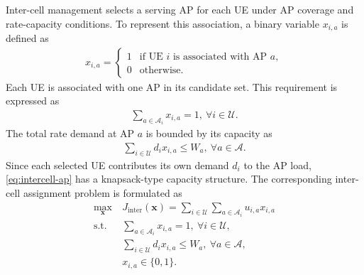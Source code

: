 \documentclass[journal]{IEEEtran}
\begin{document}
{{Inter-cell management selects a serving AP for each UE under AP coverage and rate-capacity conditions. To represent this association, a binary variable $x_{i,a}$ is defined as
\begin{align}
x_{i,a}=\begin{cases}
1 & \text{if UE $i$ is associated with AP $a$},\\
0 & \text{otherwise}.
\end{cases}
\label{eq:intercell-variable}
\end{align}
Each UE is associated with one AP in its candidate set. This requirement is expressed as
\begin{align}
\sum_{a\in\mathcal{A}_i}x_{i,a}=1,~\forall i\in\mathcal{U}.
\label{eq:intercell-ue}
\end{align}
The total rate demand at AP $a$ is bounded by its capacity as
\begin{align}
\sum_{i\in\mathcal{U}} d_i x_{i,a}\leq W_a,~\forall a\in\mathcal{A}.
\label{eq:intercell-ap}
\end{align}
Since each selected UE contributes its own demand $d_i$ to the AP load, \eqref{eq:intercell-ap} has a knapsack-type capacity structure. The corresponding inter-cell assignment problem is formulated as
\begin{align}
\max_{\bm x}~&J_{\mathrm{inter}}(\bm x)=\sum_{i\in\mathcal{U}}\sum_{a\in\mathcal{A}_i}u_{i,a}x_{i,a}\nonumber\\
\mathrm{s.t.}~&\sum_{a\in\mathcal{A}_i}x_{i,a}=1,~\forall i\in\mathcal{U},\nonumber\\
&\sum_{i\in\mathcal{U}}d_i x_{i,a}\leq W_a,~\forall a\in\mathcal{A},\nonumber\\
&x_{i,a}\in\{0,1\}.
\label{eq:inter-assignment}
\end{align}

}}
\end{document}
